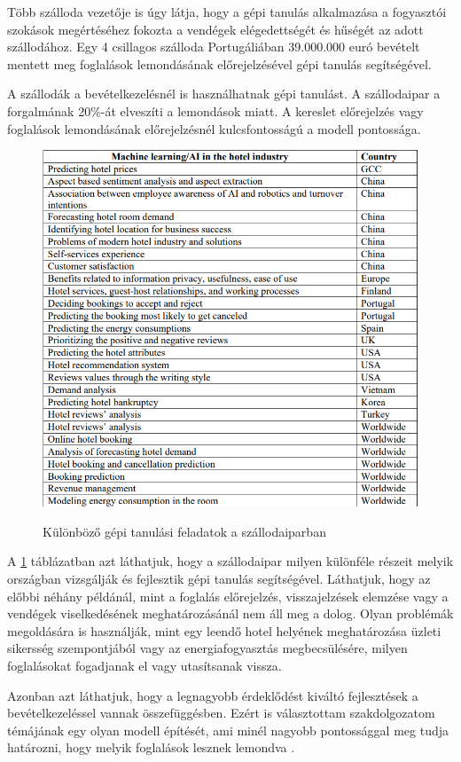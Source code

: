 Több szálloda vezetője is úgy látja, hogy a gépi tanulás alkalmazása a fogyasztói szokások megértéséhez fokozta a vendégek elégedettségét és hűségét az adott szállodához. Egy 4 csillagos szálloda Portugáliában 39.000.000 euró bevételt mentett meg foglalások lemondásának előrejelzésével gépi tanulás segítségével.

A szállodák a bevételkezelésnél is használhatnak gépi tanulást. A szállodaipar a forgalmának 20\%-át elveszíti a lemondások miatt. A kereslet előrejelzés vagy foglalások lemondásának előrejelzésnél kulcsfontosságú a modell pontossága.

\begin{figure}[hbt!]
    \centering
    \caption{Különböző gépi tanulási feladatok a szállodaiparban}
    \includegraphics[scale=0.53]{images/2.fejezet/Gepi_tanulas_szallodaipar.PNG}
    \label{fig:gepitanulasszallodaiparban}
\end{figure}

A \ref{fig:gepitanulasszallodaiparban} táblázatban azt láthatjuk, hogy a szállodaipar milyen különféle részeit melyik országban vizsgálják és fejlesztik gépi tanulás segítségével. Láthatjuk, hogy az előbbi néhány példánál, mint a foglalás előrejelzés, visszajelzések elemzése vagy a vendégek viselkedésének meghatározásánál nem áll meg a dolog. Olyan problémák megoldására is használják, mint egy leendő hotel helyének meghatározása üzleti sikersség szempontjából vagy az energiafogyasztás megbecsülésére, milyen foglalásokat fogadjanak el vagy utasítsanak vissza.

Azonban azt láthatjuk, hogy a legnagyobb érdeklődést kiváltó fejlesztések a bevételkezeléssel vannak összefüggésben. Ezért is választottam szakdolgozatom témájának egy olyan modell építését, ami minél nagyobb pontossággal meg tudja határozni, hogy melyik foglalások lesznek lemondva \cite{gepi_tanulas_szallodaipar}.